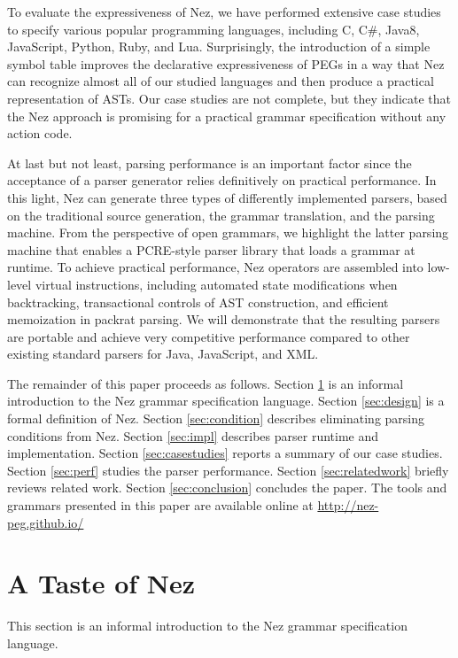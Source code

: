 \documentclass[preprint]{sigplanconf}
\begin{document}
To evaluate the expressiveness of Nez, we have performed extensive case studies to specify various popular programming languages, including C, C\#, Java8, JavaScript, Python, Ruby, and Lua. Surprisingly, the introduction of a simple symbol table improves the declarative expressiveness of PEGs in a way that Nez can recognize almost all of our studied languages and then produce a practical representation of ASTs.  
Our case studies are not complete, but they indicate that the Nez approach is promising for a practical grammar specification without any action code. 

At last but not least, parsing performance is an important factor since the acceptance of a parser generator relies definitively on practical performance. In this light, Nez can generate three types of differently implemented parsers, based on the traditional source generation, the grammar translation, and the parsing machine\cite{LPeg}. From the perspective of open grammars, we highlight the latter parsing machine that enables a PCRE-style parser library that loads a grammar at runtime. To achieve practical performance,
Nez operators are assembled into low-level virtual instructions, including automated state modifications when backtracking, transactional controls of AST construction, and efficient memoization in packrat parsing. We will demonstrate that the resulting parsers are portable and achieve very competitive performance compared to other existing standard parsers for Java, JavaScript, and XML. 

The remainder of this paper proceeds as follows. 
Section \ref{sec:nez} is an informal introduction to the Nez grammar specification language. 
Section \ref{sec:design} is a formal definition of Nez. 
Section \ref{sec:condition} describes eliminating parsing conditions from Nez.
Section \ref{sec:impl} describes parser runtime and implementation.
Section \ref{sec:casestudies} reports a summary of our case studies.
Section \ref{sec:perf} studies the parser performance.
Section \ref{sec:relatedwork} briefly reviews related work.
Section \ref{sec:conclusion} concludes the paper.
The tools and grammars presented in this paper 
are available online at \url{http://nez-peg.github.io/}

\section{A Taste of Nez} \label{sec:nez}

This section is an informal introduction to the Nez grammar specification language.
\end{document}
